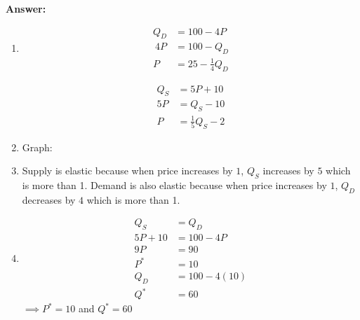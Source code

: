 \documentclass[12pt]{article}
\begin{document}
\newpage

\textbf{Answer:}

\begin{enumerate}[label = (\alph*)]
    \item \begin{align*}
        Q_D &= 100 - 4P \\\
        4P &= 100 - Q_D \\
        P &= 25 - \frac{1}{4} Q_D
    \end{align*}

    \begin{align*}
        Q_S &= 5P + 10 \\
        5P &= Q_S - 10 \\
        P &= \frac{1}{5}Q_S - 2
    \end{align*}

    \item Graph:
    
    \begin{center}
\end{center}

\item Supply is elastic because when price increases by $1$, $Q_S$ increases by $5$ which is more than 1. Demand is also elastic because when price increases by $1$, $Q_D$ decreases by $4$ which is more than 1.

\item 
\begin{align*}
    Q_S &= Q_D \\
    5P + 10 &= 100 - 4P \\
    9P &= 90 \\
    P^* &= 10 \\
    Q_D &= 100 - 4(10) \\
    Q^* & = 60
\end{align*}
$\implies P^* = 10$ and $Q^* = 60$


\end{enumerate}
\end{document}
